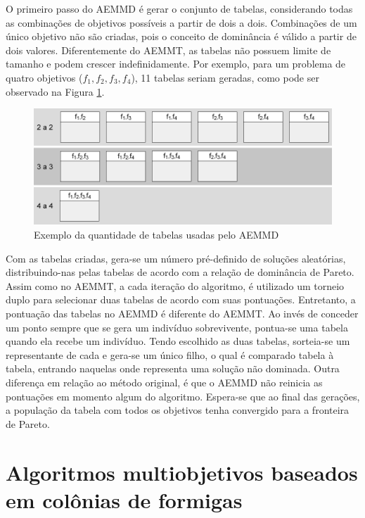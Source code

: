 O primeiro passo do AEMMD é gerar o conjunto de tabelas, considerando todas as combinações de objetivos possíveis a partir de dois a dois. Combinações de um único objetivo não são criadas, pois o conceito de dominância é válido a partir de dois valores. Diferentemente do AEMMT, as tabelas não possuem limite de tamanho e podem crescer indefinidamente. Por exemplo, para um problema de quatro objetivos ($f_1, f_2, f_3, f_4$), 11 tabelas seriam geradas, como pode ser observado na Figura \ref{fig_aemmd_tabelas}.

\begin{figure}
	\label{fig_aemmd_tabelas}
	\centering
	\includegraphics[width=1\textwidth]{cap_otimizacao-multi/figs/aeemd-tabelas}
	\caption{Exemplo da quantidade de tabelas usadas pelo AEMMD}
\end{figure}

Com as tabelas criadas, gera-se um número pré-definido de soluções aleatórias, distribuindo-nas pelas tabelas de acordo com a relação de dominância de Pareto. Assim como no AEMMT, a cada iteração do algoritmo, é utilizado um torneio duplo para selecionar duas tabelas de acordo com suas pontuações. Entretanto, a pontuação das tabelas no AEMMD é diferente do AEMMT. Ao invés de conceder um ponto sempre que se gera um indivíduo sobrevivente, pontua-se uma tabela quando ela recebe um indivíduo. Tendo escolhido as duas tabelas, sorteia-se um representante de cada e gera-se um único filho, o qual é comparado tabela à tabela, entrando naquelas onde representa uma solução não dominada. Outra diferença em relação ao método original, é que o AEMMD não reinicia as pontuações em momento algum do algoritmo. Espera-se que ao final das gerações, a população da tabela com todos os objetivos tenha convergido para a fronteira de Pareto. 

\section{Algoritmos multiobjetivos baseados em colônias de formigas}

